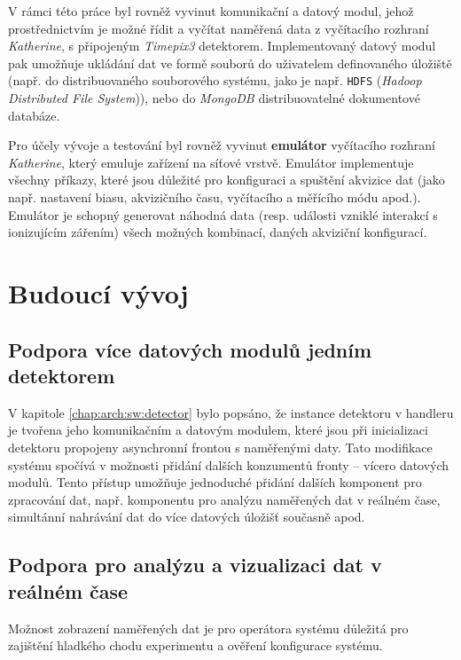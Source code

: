 V rámci této práce byl rovněž vyvinut komunikační a datový modul, jehož prostřednictvím je možné řídit a vyčítat naměřená data z vyčítacího rozhraní \textit{Katherine}, s připojeným \textit{Timepix3} detektorem. Implementovaný datový modul pak umožňuje ukládání dat ve formě souborů do uživatelem definovaného úložiště (např. do distribuovaného souborového systému, jako je např. \texttt{HDFS} (\textit{Hadoop Distributed File System})), nebo do \textit{MongoDB} distribuovatelné dokumentové databáze.

Pro účely vývoje a testování byl rovněž vyvinut \textbf{emulátor} vyčítacího rozhraní \textit{Katherine}, který emuluje zařízení na síťové vrstvě. Emulátor implementuje všechny příkazy, které jsou důležité pro konfiguraci a spuštění akvizice dat (jako např. nastavení biasu, akvizičního času, vyčítacího a měřícího módu apod.). Emulátor je schopný generovat náhodná data (resp. události vzniklé interakcí s ionizujícím zářením) všech možných kombinací, daných akviziční konfigurací.

\section{Budoucí vývoj}
\subsection{Podpora více datových modulů jedním detektorem}
V kapitole \ref{chap:arch:sw:detector} bylo popsáno, že instance detektoru v handleru je tvořena jeho komunikačním a datovým modulem, které jsou při inicializaci detektoru propojeny asynchronní frontou s naměřenými daty. Tato modifikace systému spočívá v možnosti přidání dalších konzumentů fronty -- vícero datových modulů. Tento přístup umožňuje jednoduché přidání dalších komponent pro zpracování dat, např. komponentu pro analýzu naměřených dat v reálném čase, simultánní nahrávání dat do více datových úložišť současně apod.

\subsection{Podpora pro analýzu a vizualizaci dat v reálném čase}
Možnost zobrazení naměřených dat je pro operátora systému důležitá pro zajištění hladkého chodu experimentu a ověření konfigurace systému. 

